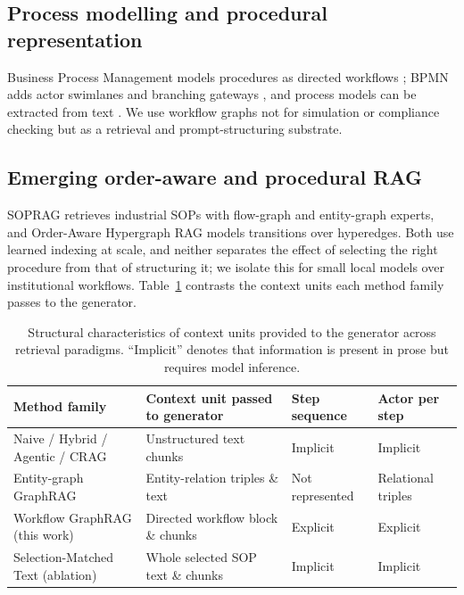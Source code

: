 \documentclass[a4paper,fleqn]{cas-sc}
\begin{document}
\subsection{Process modelling and procedural representation}
Business Process Management models procedures as directed workflows \cite{dumas2018fundamentals}; BPMN adds actor swimlanes and branching gateways \cite{omg2011bpmn}, and process models can be extracted from text \cite{friedrich2011process}. We use workflow graphs not for simulation or compliance checking but as a retrieval and prompt-structuring substrate.

\subsection{Emerging order-aware and procedural RAG}
SOPRAG \cite{lin2026sedrag} retrieves industrial SOPs with flow-graph and entity-graph experts, and Order-Aware Hypergraph RAG \cite{wu2026okhrag} models transitions over hyperedges. Both use learned indexing at scale, and neither separates the effect of selecting the right procedure from that of structuring it; we isolate this for small local models over institutional workflows. Table~\ref{tab:positioning} contrasts the context units each method family passes to the generator.

\begin{table}[!htbp]
\centering
\caption{Structural characteristics of context units provided to the generator across retrieval paradigms. ``Implicit'' denotes that information is present in prose but requires model inference.}
\label{tab:positioning}
\small
\begin{tabularx}{\textwidth}{>{\raggedright\arraybackslash}p{3.2cm} >{\raggedright\arraybackslash}X >{\raggedright\arraybackslash}p{2.1cm} >{\raggedright\arraybackslash}p{2.1cm}}
\toprule
Method family & Context unit passed to generator & Step sequence & Actor per step \\
\midrule
Naive / Hybrid / Agentic / CRAG \cite{lewis2020rag,cormack2009rrf,yao2023react,yan2024crag} & Unstructured text chunks & Implicit & Implicit \\
Entity-graph GraphRAG \cite{edge2024graphrag,guo2024lightrag} & Entity-relation triples \& text & Not represented & Relational triples \\
Workflow GraphRAG (this work) & Directed workflow block \& chunks & Explicit & Explicit \\
Selection-Matched Text (ablation) & Whole selected SOP text \& chunks & Implicit & Implicit \\
\bottomrule
\end{tabularx}
\end{table}
\end{document}
